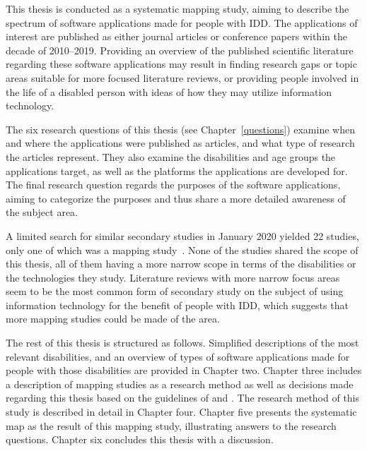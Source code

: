 \documentclass[utf8,english]{gradu3}
\begin{document}
This thesis is conducted as a systematic mapping study, aiming to describe the spectrum
of software applications made for people with IDD.
The applications of interest are published as either journal articles or conference papers
within the decade of 2010--2019.
Providing an overview of the published scientific literature regarding these software applications
may result in finding research gaps or topic areas suitable for more focused literature reviews,
or providing people involved in the life of a disabled person with ideas
of how they may utilize information technology.

The six research questions of this thesis (see Chapter~\ref{questions})
examine when and where the applications were published as articles,
and what type of research the articles represent.
They also examine the disabilities and age groups the applications target,
as well as the platforms the applications are developed for.
The final research question regards the purposes of the software applications,
aiming to categorize the purposes and thus share a more detailed awareness of the subject area.

A limited search for similar secondary studies in January 2020 yielded
22 studies, only one of which was a mapping study~\parencite{ascari2018}.
None of the studies shared the scope of this thesis,
all of them having a more narrow scope in terms of the disabilities or
the technologies they study.
Literature reviews with more narrow focus areas seem to be the most common form of secondary study
on the subject of using information technology for the benefit of people with IDD,
which suggests that more mapping studies could be made of the area.

The rest of this thesis is structured as follows.
Simplified descriptions of the most relevant disabilities, and an overview of types
of software applications made for people with those disabilities are provided in Chapter two.
Chapter three includes a description of mapping studies as a research method
as well as decisions made regarding this thesis based on the guidelines of
\textcite{petersen2008} and \textcite{petersen2015guidelines}.
The research method of this study is described in detail in Chapter four.
Chapter five presents the systematic map as the result of this mapping study,
illustrating answers to the research questions.
Chapter six concludes this thesis with a discussion.


\end{document}
